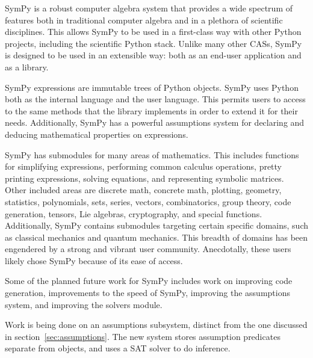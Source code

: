 SymPy is a robust computer algebra system that provides a wide spectrum of
features both in traditional computer algebra and in a plethora of scientific
disciplines. This allows SymPy to be used in a first-class way with other
Python projects, including the scientific Python stack. Unlike many other CASs, SymPy
is designed to be used in an extensible way: both as an end-user
application and as a library.

SymPy expressions are immutable trees of Python objects. SymPy uses Python both
as the internal language and the user language. This permits users to access to
the same
methods that the library implements in order to extend it for their needs.
Additionally, SymPy has a powerful assumptions
system for declaring and deducing mathematical properties on expressions.

SymPy has submodules for many areas of mathematics. This includes functions for
simplifying expressions, performing common calculus operations, pretty printing
expressions, solving equations, and representing symbolic matrices. Other included
areas
are discrete math, concrete math, plotting, geometry, statistics,
polynomials, sets, series, vectors, combinatorics, group theory, code
generation, tensors, Lie algebras, cryptography, and special functions.
Additionally, SymPy contains submodules targeting certain specific domains,
such as classical mechanics and quantum mechanics.  This breadth of domains has
been engendered by a strong and vibrant user community.
Anecdotally, these users likely chose SymPy because of its ease of access.


Some of the planned future work for SymPy includes work on improving code
generation, improvements to the speed of SymPy, improving the assumptions
system, and improving the solvers module.


Work is being done on an assumptions subsystem, distinct from the one
discussed in section~\ref{sec:assumptions}. The new system stores assumption
predicates separate from objects, and uses a SAT solver to do inference.


